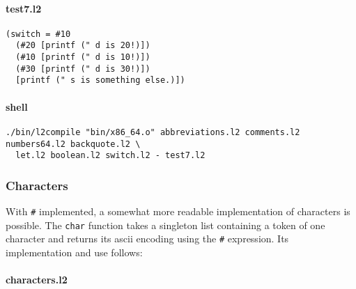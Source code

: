 \documentclass[]{article}
\let\oldparagraph\paragraph
\renewcommand{\paragraph}[1]{\oldparagraph{#1}\mbox{}}
\begin{document}
\paragraph{test7.l2}\label{test7.l2}

\begin{verbatim}
(switch = #10
  (#20 [printf (" d is 20!)])
  (#10 [printf (" d is 10!)])
  (#30 [printf (" d is 30!)])
  [printf (" s is something else.)])
\end{verbatim}

\paragraph{shell}\label{shell-6}

\begin{verbatim}
./bin/l2compile "bin/x86_64.o" abbreviations.l2 comments.l2 numbers64.l2 backquote.l2 \
  let.l2 boolean.l2 switch.l2 - test7.l2
\end{verbatim}

\hypertarget{characters}{\subsubsection{Characters}\label{characters}}

With \texttt{\#} implemented, a somewhat more readable implementation of
characters is possible. The \texttt{char} function takes a singleton
list containing a token of one character and returns its ascii encoding
using the \texttt{\#} expression. Its implementation and use follows:

\paragraph{characters.l2}\label{characters.l2}
\end{document}

